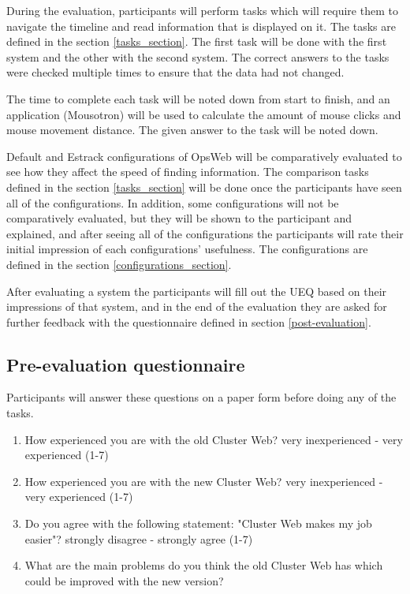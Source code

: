 During the evaluation, participants will perform tasks which will require them to navigate the timeline and read information that is displayed on it. The tasks are defined in the section \ref{tasks_section}. The first task will be done with the first system and the other with the second system. The correct answers to the tasks were checked multiple times to ensure that the data had not changed.

The time to complete each task will be noted down from start to finish, and an application (Mousotron) \cite{mousotron} will be used to calculate the amount of mouse clicks and mouse movement distance. The given answer to the task will be noted down.

Default and Estrack configurations of OpsWeb will be comparatively evaluated to see how they affect the speed of finding information. The comparison tasks defined in the section \ref{tasks_section} will be done once the participants have seen all of the configurations. In addition, some configurations will not be comparatively evaluated, but they will be shown to the participant and explained, and after seeing all of the configurations the participants will rate their initial impression of each configurations' usefulness. The configurations are defined in the section \ref{configurations_section}.

 After evaluating a system the participants will fill out the UEQ based on their impressions of that system, and in the end of the evaluation they are asked for further feedback with the questionnaire defined in section \ref{post-evaluation}.

\subsection{Pre-evaluation questionnaire} \label{pre-evaluation}
Participants will answer these questions on a paper form before doing any of the tasks.
\begin{enumerate}
\item How experienced you are with the old Cluster Web? very inexperienced - very experienced (1-7)
\item How experienced you are with the new Cluster Web? very inexperienced - very experienced (1-7)
\item Do you agree with the following statement: "Cluster Web makes my job easier"? strongly disagree - strongly agree (1-7)
\item What are the main problems do you think the old Cluster Web has which could be improved with the new version?
\end{enumerate}

